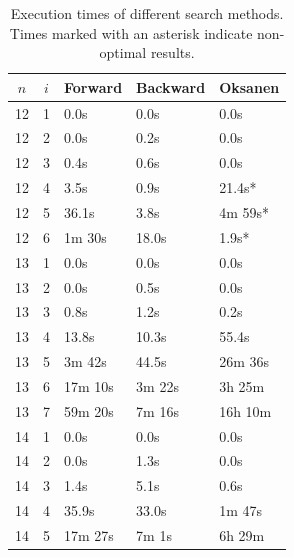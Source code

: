 \documentclass[twoside,leqno,twocolumn]{article}
\begin{document}
\begin{table}[!t]
  \renewcommand{\arraystretch}{1.1}
  \caption{Execution times of different search methods.
    Times marked with an asterisk indicate non-optimal results.}
  \label{table:search_algorithms}
  \centering
  \small
  \begin{tabular}{c|c|l|l|l}
    $n$ & $i$ & \textbf{Forward} & \textbf{Backward} & \textbf{Oksanen} \\
    \hline
    12  & 1   & 0.0s             & 0.0s              & 0.0s             \\
    12  & 2   & 0.0s             & 0.2s              & 0.0s             \\
    12  & 3   & 0.4s             & 0.6s              & 0.0s             \\
    12  & 4   & 3.5s             & 0.9s              & 21.4s*           \\
    12  & 5   & 36.1s            & 3.8s              & 4m 59s*          \\
    12  & 6   & 1m 30s           & 18.0s             & 1.9s*            \\
    \hline
    13  & 1   & 0.0s             & 0.0s              & 0.0s             \\
    13  & 2   & 0.0s             & 0.5s              & 0.0s             \\
    13  & 3   & 0.8s             & 1.2s              & 0.2s             \\
    13  & 4   & 13.8s            & 10.3s             & 55.4s            \\
    13  & 5   & 3m 42s           & 44.5s             & 26m 36s          \\
    13  & 6   & 17m 10s          & 3m 22s            & 3h 25m           \\
    13  & 7   & 59m 20s          & 7m 16s            & 16h 10m          \\
    \hline
    14  & 1   & 0.0s             & 0.0s              & 0.0s             \\
    14  & 2   & 0.0s             & 1.3s              & 0.0s             \\
    14  & 3   & 1.4s             & 5.1s              & 0.6s             \\
    14  & 4   & 35.9s            & 33.0s             & 1m 47s           \\
    14  & 5   & 17m 27s          & 7m 1s             & 6h 29m           \\

\end{tabular}
\end{table}
\end{document}
